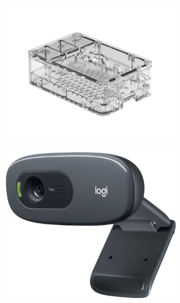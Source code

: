 \documentclass[../Head/report.tex]{subfiles}
\begin{document}
\begin{figure}[H]
\begin{subfigure}[b]{.25\textwidth}
          \vspace{-2.0em}
        \caption{}
        \label{fig:raspberry_pi}
    \end{subfigure}
     \hspace{-0.5em}
        \begin{subfigure}[b]{.30\textwidth}
        \centering
        \includegraphics[width=1\linewidth]{../Figures/raspberry_pi/raspberry_pi_case.png}
         \vspace{-2.3em}
        \caption{}
        \label{fig:raspberry_pi_case}
    \end{subfigure}
     \hspace{-2.0em}
          \hspace{8.0em}
        \begin{subfigure}[b]{.17\textwidth}
        \centering
        \includegraphics[width=1\linewidth]{../Figures/raspberry_pi/c270_dh_webcam.png}

\end{subfigure}
\end{figure}
\end{document}
